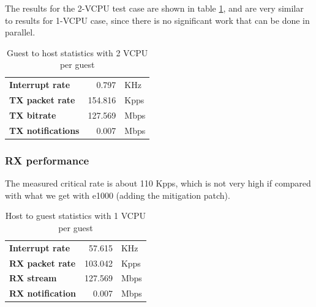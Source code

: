 The results for the 2-VCPU test case are shown in table \ref{tab:virtionet-tx-g2h2vcpu}, and are very similar to results for 1-VCPU case,
since there is no significant work that can be done in parallel.

\begin{table}
\begin{center}
\begin{tabular}{lrl}
\toprule
\textbf{Interrupt rate} & 0.797 & KHz\\
\textbf{TX packet rate} & 154.816 & Kpps\\
\textbf{TX bitrate} & 127.569 & Mbps\\
\textbf{TX notifications} & 0.007 & Mbps\\
\bottomrule
\end{tabular}
\end{center}
\caption{Guest to host statistics with 2 VCPU per guest}
\label{tab:virtionet-tx-g2h2vcpu}
\end{table}


\subsubsection{RX performance}
\label{sec:virtionet-perf-rx}
The measured critical rate is about 110 Kpps, which is not very high if compared with what we get with e1000 (adding the mitigation patch).

\begin{table}
\begin{center}
\begin{tabular}{lrl}
\toprule
\textbf{Interrupt rate} & 57.615 & KHz\\
\textbf{RX packet rate} & 103.042 & Kpps\\
\textbf{RX stream} & 127.569 & Mbps\\
\textbf{RX notification} & 0.007 & Mbps\\
\bottomrule
\end{tabular}
\end{center}
\caption{Host to guest statistics with 1 VCPU per guest}
\label{tab:virtionet-rx-g1hvcpu}
\end{table}

